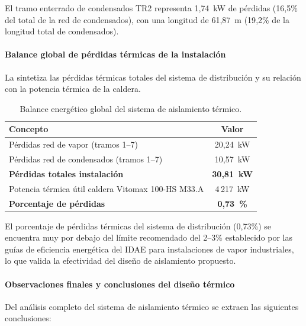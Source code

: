 El tramo enterrado de condensados TR2 representa 1{,}74~kW de pérdidas (16{,}5\% del total de la red de condensados), con una longitud de 61{,}87~m (19{,}2\% de la longitud total de condensados).

\paragraph{Balance global de pérdidas térmicas de la instalación}
\label{par:balance_global_aislamiento}

La  sintetiza las pérdidas térmicas totales del sistema de distribución y su relación con la potencia térmica de la caldera.

\begin{table}[htbp]
	\centering
	\caption{Balance energético global del sistema de aislamiento térmico.}
	\label{tab:balance_global_aislamiento}
	\begin{tabular}{lc}
		\toprule
		\textbf{Concepto}                                  & \textbf{Valor}      \\
		\midrule
		Pérdidas red de vapor (tramos 1--7)                & 20{,}24~kW          \\
		Pérdidas red de condensados (tramos 1--7)          & 10{,}57~kW          \\
		\midrule
		\textbf{Pérdidas totales instalación}              & \textbf{30{,}81~kW} \\
		\midrule[0.5pt]
		Potencia térmica útil caldera Vitomax 100-HS M33.A & 4\,217~kW           \\
		\midrule
		\textbf{Porcentaje de pérdidas}                    & \textbf{0{,}73~\%}  \\
		\bottomrule
	\end{tabular}
\end{table}

El porcentaje de pérdidas térmicas del sistema de distribución (0{,}73\%) se encuentra muy por debajo del límite recomendado del 2--3\% establecido por las guías de eficiencia energética del IDAE para instalaciones de vapor industriales, lo que valida la efectividad del diseño de aislamiento propuesto.

\paragraph{Observaciones finales y conclusiones del diseño térmico}
\label{par:conclusiones_aislamiento}

Del análisis completo del sistema de aislamiento térmico se extraen las siguientes conclusiones:

